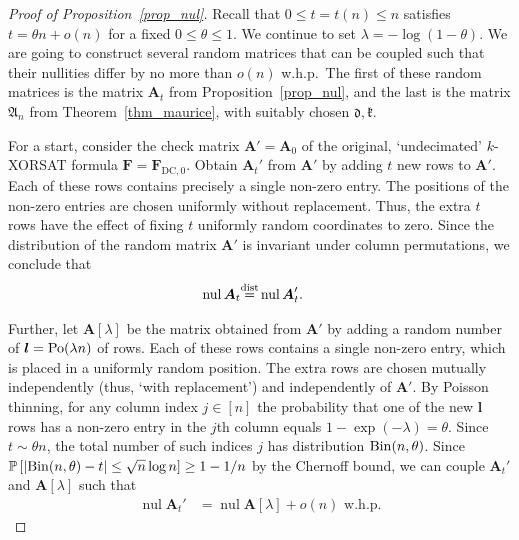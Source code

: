 \documentclass[10pt,reqno]{amsart}
\numberwithin{equation}{section}
\renewcommand{\vec}[1]{\boldsymbol{#1}}
\newcommand{\FDC}[1]{\PHI_{\mathrm{DC},{#1}}}
\newcommand\disteq{\stacksign{dist}{=}}
\newcommand\PHI{\vec F}
\newcommand\fA{\mathfrak A}
\newcommand\fd{\mathfrak d}
\newcommand\fk{\mathfrak k}
\newcommand\vA{\vec A}
\newcommand\vl{\vec l}
\newcommand{\Po}{{\rm Po}}
\newcommand{\Bin}{{\rm Bin}}
\newcommand\brk[1]{\left\lbrack{#1}\right\rbrack}
\newcommand{\whp}{w.h.p.}
\newcommand{\stacksign}[2]{{\stackrel{\mbox{\scriptsize #1}}{#2}}}
\newcommand\pr{\mathbb{P}}
\newcommand\Prop{Proposition}
\newcommand\Thm{Theorem}
\DeclareMathOperator{\nul}{nul}
\def\pr{{\mathbb P}}
\begin{document}
\begin{proof}[Proof of \Prop~\ref{prop_nul}]
	Recall that $0\leq t=t(n)\leq n$ satisfies $t=\theta n+o(n)$ for a fixed $0\leq\theta\leq 1$.
	We continue to set $\lambda=-\log(1-\theta)$.
	We are going to construct several random matrices that can be coupled such that their nullities differ by no more than $o(n)$ \whp\
	The first of these random matrices is the matrix $\vA_t$ from \Prop~\ref{prop_nul}, and the last is the matrix $\fA_n$ from \Thm~\ref{thm_maurice}, with suitably chosen $\fd,\fk$.

	For a start, consider the check matrix $\vA'=\vA_0$ of the original, `undecimated' $k$-XORSAT formula $\PHI=\FDC 0$.
	Obtain $\vA_{t}'$ from $\vA'$ by adding $t$ new rows to $\vA'$.
	Each of these rows contains precisely a single non-zero entry.
	The positions of the non-zero entries are chosen uniformly without replacement.
	Thus, the extra $t$ rows have the effect of fixing $t$ uniformly random coordinates to zero.
	Since the distribution of the random matrix $\vA'$ is invariant under column permutations, we conclude that
	\begin{align}\label{eq_prop_nul_1}
		\nul\vA_t&\disteq\nul\vA_t'.
	\end{align}

	Further, let $\vA[\lambda]$ be the matrix obtained from $\vA'$ by adding a random number of $\vl=\Po(\lambda n)$ of rows.
	Each of these rows contains a single non-zero entry, which is placed in a uniformly random position.
	The extra rows are chosen mutually independently (thus, `with replacement') and independently of $\vA'$.
	By Poisson thinning, for any column index $j\in[n]$ the probability that one of the new $\vl$ rows has a non-zero entry in the $j$th column equals $1-\exp(-\lambda)=\theta$.
	Since $t\sim\theta n$, the total number of such indices $j$ has distribution $\Bin(n,\theta)$.
	Since $\pr\brk{|\Bin(n,\theta)-t|\leq\sqrt n\log n}\geq 1-1/n$ by the Chernoff bound, we can couple $\vA_t'$ and $\vA\brk{\lambda}$ such that 
	\begin{align}\label{eq_prop_nul_2}
		\nul\vA_t'&=\nul\vA\brk{\lambda}+o(n)\mbox{ \whp}	
	\end{align}


\end{proof}
\end{document}
